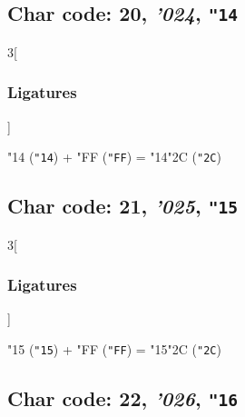 \documentclass{article}
\newlength{\maxcharwidth}
\begin{document}
\subsection{Char code: 20, {\it'024}, {\tt"14}}
\label{char_20}


\begin{multicols}{3}[\subsubsection{Ligatures}]

{\testfont\char"14\noboundary} ({\tt"14}) + {\testfont\char"FF\noboundary} ({\tt"FF}) = {\testfont\char"14\noboundary}{\testfont\char"2C\noboundary} ({\tt"2C}) 

\end{multicols}

\subsection{Char code: 21, {\it'025}, {\tt"15}}
\label{char_21}


\begin{multicols}{3}[\subsubsection{Ligatures}]

{\testfont\char"15\noboundary} ({\tt"15}) + {\testfont\char"FF\noboundary} ({\tt"FF}) = {\testfont\char"15\noboundary}{\testfont\char"2C\noboundary} ({\tt"2C}) 

\end{multicols}

\subsection{Char code: 22, {\it'026}, {\tt"16}}
\label{char_22}
\end{document}
